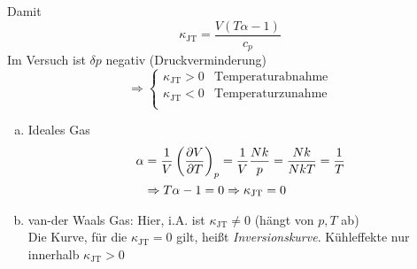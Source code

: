 Damit
\begin{equation}
    \kappa_\text{JT} = \frac{V \left( T \alpha - 1 \right) }{c_p}
\end{equation}
Im Versuch ist $\delta p$ negativ (Druckverminderung)
\begin{equation}
    \Rightarrow
    \begin{cases}
        \kappa_\text{JT} > 0 & \text{Temperaturabnahme} \\
        \kappa_\text{JT} < 0 & \text{Temperaturzunahme} \\
    \end{cases}
\end{equation}
\begin{enumerate}[a)]  %
    \item Ideales Gas
    \begin{equation}
        \begin{split}
            \alpha &= \frac{1}{V} \left( \frac{\partial V}{\partial T} \right)_{p} = \frac{1}{V} \frac{N k}{p} = \frac{N k}{N k T} = \frac{1}{T} \\
            & \Rightarrow T \alpha - 1 = 0 \Rightarrow \kappa_\text{JT} = 0
        \end{split}
    \end{equation}
    \item van-der Waals Gas: Hier, i.A. ist $\kappa_\text{JT} \neq 0$ (hängt von $p, T$ ab) \\
    Die Kurve, für die $\kappa_\text{JT} = 0 $ gilt, heißt \emph{Inversionskurve}. Kühleffekte nur innerhalb 
    $\kappa_\text{JT} > 0$
\end{enumerate}

